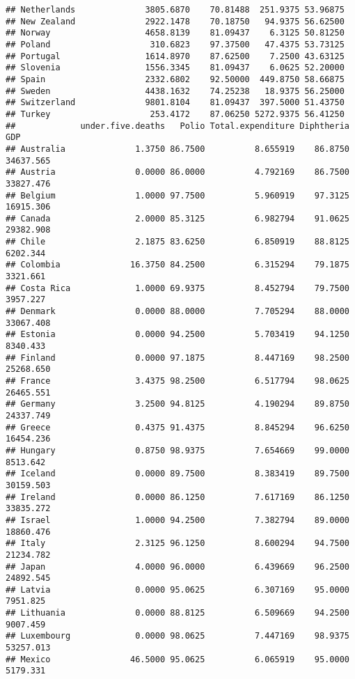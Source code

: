 \documentclass[
]{article}
\begin{document}
\begin{verbatim}
## Netherlands              3805.6870    70.81488  251.9375 53.96875
## New Zealand              2922.1478    70.18750   94.9375 56.62500
## Norway                   4658.8139    81.09437    6.3125 50.81250
## Poland                    310.6823    97.37500   47.4375 53.73125
## Portugal                 1614.8970    87.62500    7.2500 43.63125
## Slovenia                 1556.3345    81.09437    6.0625 52.20000
## Spain                    2332.6802    92.50000  449.8750 58.66875
## Sweden                   4438.1632    74.25238   18.9375 56.25000
## Switzerland              9801.8104    81.09437  397.5000 51.43750
## Turkey                    253.4172    87.06250 5272.9375 56.41250
##             under.five.deaths   Polio Total.expenditure Diphtheria       GDP
## Australia              1.3750 86.7500          8.655919    86.8750 34637.565
## Austria                0.0000 86.0000          4.792169    86.7500 33827.476
## Belgium                1.0000 97.7500          5.960919    97.3125 16915.306
## Canada                 2.0000 85.3125          6.982794    91.0625 29382.908
## Chile                  2.1875 83.6250          6.850919    88.8125  6202.344
## Colombia              16.3750 84.2500          6.315294    79.1875  3321.661
## Costa Rica             1.0000 69.9375          8.452794    79.7500  3957.227
## Denmark                0.0000 88.0000          7.705294    88.0000 33067.408
## Estonia                0.0000 94.2500          5.703419    94.1250  8340.433
## Finland                0.0000 97.1875          8.447169    98.2500 25268.650
## France                 3.4375 98.2500          6.517794    98.0625 26465.551
## Germany                3.2500 94.8125          4.190294    89.8750 24337.749
## Greece                 0.4375 91.4375          8.845294    96.6250 16454.236
## Hungary                0.8750 98.9375          7.654669    99.0000  8513.642
## Iceland                0.0000 89.7500          8.383419    89.7500 30159.503
## Ireland                0.0000 86.1250          7.617169    86.1250 33835.272
## Israel                 1.0000 94.2500          7.382794    89.0000 18860.476
## Italy                  2.3125 96.1250          8.600294    94.7500 21234.782
## Japan                  4.0000 96.0000          6.439669    96.2500 24892.545
## Latvia                 0.0000 95.0625          6.307169    95.0000  7951.825
## Lithuania              0.0000 88.8125          6.509669    94.2500  9007.459
## Luxembourg             0.0000 98.0625          7.447169    98.9375 53257.013
## Mexico                46.5000 95.0625          6.065919    95.0000  5179.331

\end{verbatim}
\end{document}
